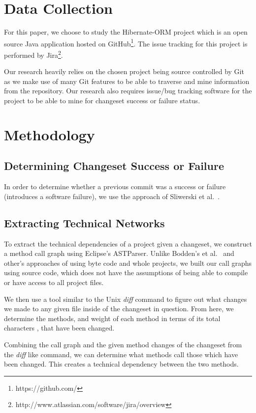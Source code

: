 \documentclass[conference]{IEEEtran}
\begin{document}
\section{Data Collection}
For this paper, we choose to study the Hibernate-ORM project which is an open source Java 
application hosted on GitHub\footnote{https://github.com/}. 
The issue tracking for this project is performed by Jira\footnote{http://www.atlassian.com/software/jira/overview}.

Our research heavily relies on the chosen project being source controlled by Git as we make use of many
Git features to be able to traverse and mine information from the repository. Our research also
requires issue/bug tracking software for the project to be able to mine for changeset success or
failure status.


\section{Methodology}

\subsection{Determining Changeset Success or Failure}
In order to determine whether a previous commit was a success or failure (introduces a software
failure), we use the approach of Sliwerski et al.~\cite{Sliwerski:2005:CIF}.

\subsection{Extracting Technical Networks}
To extract the technical dependencies of a project given a changeset, we construct a method
call graph using Eclipse's ASTParser. 
Unlike  Bodden's et al.~\cite{Bodden:2003:HVJ} and other's approaches of using byte code
and whole projects, we built our call graphs using source code, which does not have the assumptions
of being able to compile or have access to all project files.

We then use a tool similar to the Unix \textit{diff} command to figure out what changes we made 
to any given file inside of the changeset in question. From here, we determine the methods, 
and weight of each method in terms of its total characters , that have been changed.

Combining the call graph and the given method changes of the changeset from the \textit{diff} like 
command,  we can determine what methods call those which have been changed. This creates a 
technical dependency between the two methods.
\end{document}
